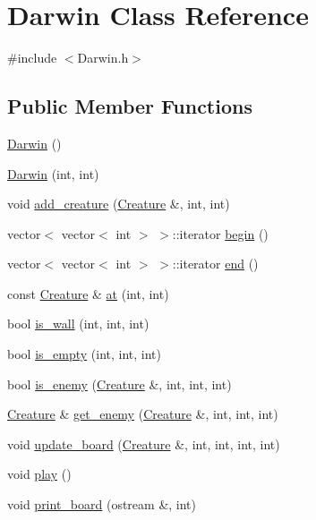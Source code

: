 \hypertarget{classDarwin}{\section{Darwin Class Reference}
\label{classDarwin}
}


{\ttfamily \#include $<$Darwin.\-h$>$}

\subsection*{Public Member Functions}
\begin{DoxyCompactItemize}
\item 
\hyperlink{classDarwin_a0bd882cc82538795f11b8ac3a8eb7965}{Darwin} ()
\item 
\hyperlink{classDarwin_ab2010af755d3a8d45dc5945f5fcb5f41}{Darwin} (int, int)
\item 
void \hyperlink{classDarwin_acdede1f8161d3ed89e5e42a56b1695ea}{add\-\_\-creature} (\hyperlink{classCreature}{Creature} \&, int, int)
\item 
vector$<$ vector$<$ int $>$ $>$\-::iterator \hyperlink{classDarwin_ae3b6c9f9e8a12018e1d25c1fa96fe2a8}{begin} ()
\item 
vector$<$ vector$<$ int $>$ $>$\-::iterator \hyperlink{classDarwin_a37bee621277902fc6232d51264bb3ffa}{end} ()
\item 
const \hyperlink{classCreature}{Creature} \& \hyperlink{classDarwin_a9329ee602618041a4b61c8f9abe941f6}{at} (int, int)
\item 
bool \hyperlink{classDarwin_a513e407abcf935e66ec5e3975db52f07}{is\-\_\-wall} (int, int, int)
\item 
bool \hyperlink{classDarwin_a9ca251622860791a8db0b525c96ae506}{is\-\_\-empty} (int, int, int)
\item 
bool \hyperlink{classDarwin_add690e97597d447e9a20228c7f5ce3bc}{is\-\_\-enemy} (\hyperlink{classCreature}{Creature} \&, int, int, int)
\item 
\hyperlink{classCreature}{Creature} \& \hyperlink{classDarwin_a5724100eaac93825259a663d6549d850}{get\-\_\-enemy} (\hyperlink{classCreature}{Creature} \&, int, int, int)
\item 
void \hyperlink{classDarwin_ae12abd1d8ec7d4a34f67f21ad1b5a273}{update\-\_\-board} (\hyperlink{classCreature}{Creature} \&, int, int, int, int)
\item 
void \hyperlink{classDarwin_a85dfcf2c8de0960326c6d761e9a14007}{play} ()
\item 
void \hyperlink{classDarwin_a738c0a95cca373944a221cdb1687797a}{print\-\_\-board} (ostream \&, int)
\end{DoxyCompactItemize}
